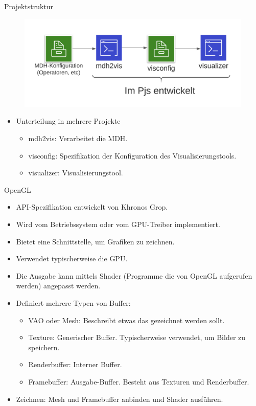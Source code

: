 \documentclass{presentation}
\begin{document}
\begin{frame}{Projektstruktur}
    \begin{figure}
        \includegraphics[scale=0.5]{struktur.png}
    \end{figure}
    
    \begin{itemize}
        \item Unterteilung in mehrere Projekte
            \begin{itemize}
                \item mdh2vis: Verarbeitet die MDH.
                \item visconfig: Spezifikation der Konfiguration des Visualisierungstools.
                \item visualizer: Visualisierungstool.
            \end{itemize}
    \end{itemize}
\end{frame}
\begin{frame}{OpenGL}
    \begin{itemize}
        \item API-Spezifikation entwickelt von Khronos Grop.
        \item Wird vom Betriebssystem oder vom GPU-Treiber implementiert.
        \item Bietet eine Schnittstelle, um Grafiken zu zeichnen.
        \item Verwendet typischerweise die GPU.
        \item Die Ausgabe kann mittels Shader (Programme die von OpenGL aufgerufen werden) angepasst werden.
        \item Definiert mehrere Typen von Buffer:
        \begin{itemize}
            \item VAO oder Mesh: Beschreibt etwas das gezeichnet werden sollt.
            \item Texture: Generischer Buffer. Typischerweise verwendet, um Bilder zu speichern.
            \item Renderbuffer: Interner Buffer.
            \item Framebuffer: Ausgabe-Buffer. Besteht aus Texturen und Renderbuffer.
        \end{itemize}
        \item Zeichnen: Mesh und Framebuffer anbinden und Shader ausführen.
    \end{itemize}
\end{frame}
\end{document}
